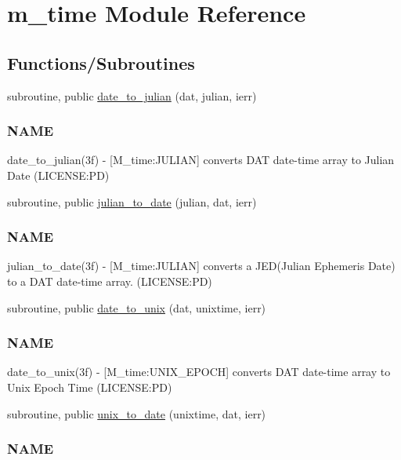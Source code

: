 \hypertarget{namespacem__time}{}\section{m\+\_\+time Module Reference}
\label{namespacem__time}
\subsection*{Functions/\+Subroutines}
\begin{DoxyCompactItemize}
\item 
subroutine, public \mbox{\hyperlink{namespacem__time_acfdc970b4154b0c15bd33727636e3992}{date\+\_\+to\+\_\+julian}} (dat, julian, ierr)
\begin{DoxyCompactList}\small\item\em \subsubsection*{N\+A\+ME}

date\+\_\+to\+\_\+julian(3f) -\/ \mbox{[}M\+\_\+time\+:J\+U\+L\+I\+AN\mbox{]} converts D\+AT date-\/time array to Julian Date (L\+I\+C\+E\+N\+SE\+:PD) \end{DoxyCompactList}\item 
subroutine, public \mbox{\hyperlink{namespacem__time_abb44cf18cd0a3e420c20469efb056203}{julian\+\_\+to\+\_\+date}} (julian, dat, ierr)
\begin{DoxyCompactList}\small\item\em \subsubsection*{N\+A\+ME}

julian\+\_\+to\+\_\+date(3f) -\/ \mbox{[}M\+\_\+time\+:J\+U\+L\+I\+AN\mbox{]} converts a J\+E\+D(\+Julian Ephemeris Date) to a D\+AT date-\/time array. (L\+I\+C\+E\+N\+SE\+:PD) \end{DoxyCompactList}\item 
subroutine, public \mbox{\hyperlink{namespacem__time_aed245c691853279ebf0ce899dec9caa9}{date\+\_\+to\+\_\+unix}} (dat, unixtime, ierr)
\begin{DoxyCompactList}\small\item\em \subsubsection*{N\+A\+ME}

date\+\_\+to\+\_\+unix(3f) -\/ \mbox{[}M\+\_\+time\+:U\+N\+I\+X\+\_\+\+E\+P\+O\+CH\mbox{]} converts D\+AT date-\/time array to Unix Epoch Time (L\+I\+C\+E\+N\+SE\+:PD) \end{DoxyCompactList}\item 
subroutine, public \mbox{\hyperlink{namespacem__time_acc62ada23f8fa2fe67b428702fbcbf1c}{unix\+\_\+to\+\_\+date}} (unixtime, dat, ierr)
\begin{DoxyCompactList}\small\item\em \subsubsection*{N\+A\+ME}


\end{DoxyCompactList}
\end{DoxyCompactItemize}
